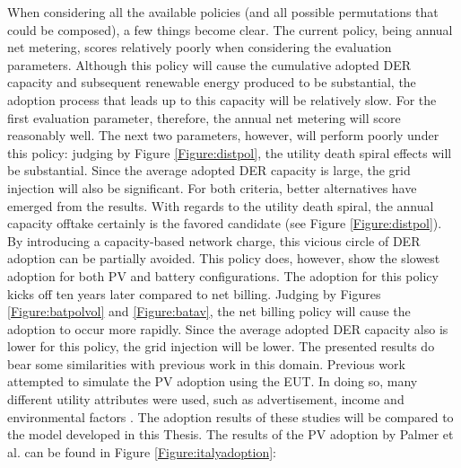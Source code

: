 When considering all the available policies (and all possible permutations that could be composed), a few things become clear. The current policy, being annual net metering, scores relatively poorly when considering the evaluation parameters. Although this policy will cause the cumulative adopted DER capacity and subsequent renewable energy produced to be substantial, the adoption process that leads up to this capacity will be relatively slow. For the first evaluation parameter, therefore, the annual net metering will score reasonably well. The next two parameters, however, will perform poorly under this policy: judging by Figure \ref{Figure:distpol}, the utility death spiral effects will be substantial. Since the average adopted DER capacity is large, the grid injection will also be significant. For both criteria, better alternatives have emerged from the results. With regards to the utility death spiral, the annual capacity offtake certainly is the favored candidate (see Figure \ref{Figure:distpol}). By introducing a capacity-based network charge, this vicious circle of DER adoption can be partially avoided. This policy does, however, show the slowest adoption for both PV and battery configurations. The adoption for this policy kicks off ten years later compared to net billing. Judging by Figures \ref{Figure:batpolvol} and \ref{Figure:batav}, the net billing policy will cause the adoption to occur more rapidly. Since the average adopted DER capacity also is lower for this policy, the grid injection will be lower. 
\newline \newline \noindent
The presented results do bear some similarities with previous work in this domain. Previous work attempted to simulate the PV adoption using the EUT. In doing so, many different utility attributes were used, such as advertisement, income and environmental factors \cite{ABMPV,ItalyAdoption}. The adoption results of these studies will be compared to the model developed in this Thesis. The results of the PV adoption by Palmer et al. can be found in Figure \ref{Figure:italyadoption}: 

